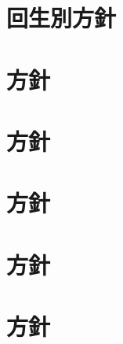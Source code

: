 \section{回生別方針}




\section{\kaikeiDepartment{}方針}

\section{\kensuiDepartment{}方針}

\section{\syogaiDepartment{}方針}

\section{\systemDepartment{}方針}

\section{\soumuDepartment{}方針}

